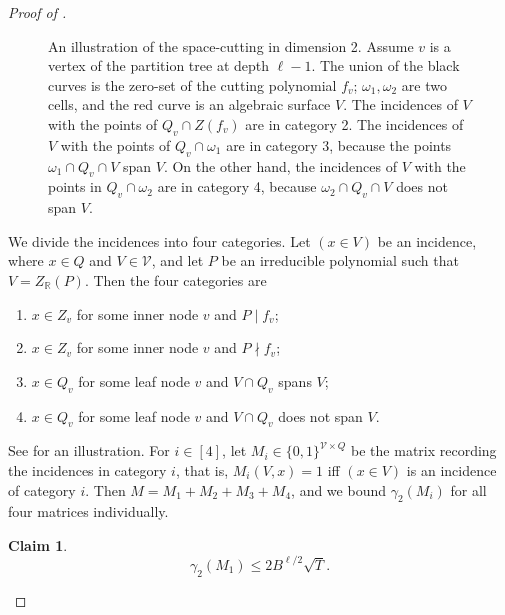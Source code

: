 \documentclass[11pt]{article}
\theoremstyle{plain}
\newtheorem{claim}[theorem]{Claim}
\theoremstyle{definition}
\begin{document}
\begin{proof}[Proof of ]
\begin{figure}
\begin{center}
\end{center}
\caption{An illustration of the space-cutting in dimension 2. Assume $v$ is a vertex of the partition tree at depth $\ell-1$. The union of the black curves is the zero-set of the cutting polynomial $f_v$; $\omega_1,\omega_2$ are two cells, and the red curve is an algebraic surface $V$. The incidences of $V$ with the points of $Q_v\cap Z(f_v)$ are in category 2.  The incidences of $V$ with the points of $Q_v\cap \omega_1$ are in category 3, because the points $\omega_1\cap Q_v \cap V$ span $V$. On the other hand, the incidences of $V$ with the points in $Q_v\cap \omega_2$ are in category 4, because $\omega_2\cap Q_v\cap V $ does not span $V$.}
\label{fig:1}
\end{figure}

		
		We divide the incidences into four categories. Let $(x\in V)$ be an incidence, where $x\in Q$ and $V\in \mathcal{V}$, and let $P$ be an irreducible polynomial such that $V=Z_{\mathbb{R}}(P)$. Then the four categories are
		\begin{enumerate}
			\item $x\in Z_v$ for some inner node $v$ and $P\mid f_v$;
			\item $x\in Z_v$ for some inner node $v$ and $P\nmid f_v$;
			\item $x\in Q_v$ for some leaf node $v$ and $V\cap Q_v$ spans $V$;
			\item $x\in Q_v$ for some leaf node $v$ and $V\cap Q_v$ does not span $V$.
		\end{enumerate}
		See  for an illustration. For $i\in [4]$, let $M_i\in \{0,1\}^{\mathcal{V}\times Q}$ be the matrix recording the incidences in category $i$, that is, $M_i(V,x)=1$ iff $(x\in V)$ is an incidence of category $i$. Then $M=M_1+M_2+M_3+M_4$, and we bound $\gamma_2(M_i)$ for all four matrices individually.
		
		\begin{claim}
			$$\gamma_2(M_1)\leq2 B^{\ell/2}\sqrt{T}.$$
		\end{claim}
		

\end{proof}
\end{document}
